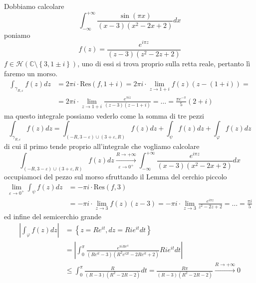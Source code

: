 Dobbiamo calcolare
\begin{equation*}
\int ^{+\infty }_{-\infty }\frac{\sin\left( \pi x\right)}{\left( x-3\right)\left( x^{2} -2x+2\right)} dx
\end{equation*}
poniamo
\begin{equation*}
f\left( z\right) =\frac{e^{i\pi z}}{\left( z-3\right)\left( z^{2} -2z+2\right)}
\end{equation*}
$f\in \mathcal{H}\left(\mathbb{C} \setminus \left\{3,1\pm i\right\}\right)$, uno di essi si trova proprio sulla retta reale, pertanto lì faremo un morso.
\begin{align*}
\int _{\gamma _{R,\varepsilon }} f\left( z\right) dz & =2\pi i\cdotp \mathrm{Res}\left( f,1+i\right) =2\pi i\cdotp \lim _{z\rightarrow 1+i} f\left( z\right)\left( z-\left( 1+i\right)\right) =\\
 & =2\pi i\cdotp \lim _{z\rightarrow 1+i}\frac{e^{\pi iz}}{\left( z-3\right)\left( z-1+i\right)} =\dotsc =\frac{\pi e^{-\pi }}{5}\left( 2+i\right)
\end{align*}
ma questo integrale possiamo vederlo come la somma di tre pezzi
\begin{equation*}
\int _{\gamma _{R,\varepsilon }} f\left( z\right) dz=\int _{\left( -R,3-\varepsilon \right) \cup \left( 3+\varepsilon ,R\right)} f\left( z\right) dz+\int _{\psi } f\left( z\right) dz+\int _{\varphi } f\left( z\right) dz
\end{equation*}
di cui il primo tende proprio all'integrale che vogliamo calcolare
\begin{equation*}
\int _{\left( -R,3-\varepsilon \right) \cup \left( 3+\varepsilon ,R\right)} f\left( z\right) dz\xrightarrow[\varepsilon \rightarrow 0^{+}]{R\rightarrow +\infty }\int ^{+\infty }_{-\infty }\frac{e^{i\pi z}}{\left( x-3\right)\left( x^{2} -2x+2\right)} dx
\end{equation*}
occupiamoci del pezzo sul morso sfruttando il Lemma del cerchio piccolo
\begin{align*}
\lim _{\varepsilon \rightarrow 0^{+}}\int _{\psi } f\left( z\right) dz & =-\pi i\cdotp \mathrm{Res}\left( f,3\right)\\
 & =-\pi i\cdotp \lim _{z\rightarrow 3} f\left( z\right)\left( z-3\right) =-\pi i\cdotp \lim _{z\rightarrow 3}\frac{e^{i\pi z}}{z^{2} -2z+2} =\dotsc =\frac{\pi i}{5}
\end{align*}
ed infine del semicerchio grande
\begin{align*}
\left| \int _{\varphi } f\left( z\right) dz\right|  & =\left\{z=Re^{it} ,dz=Rie^{it} dt\right\}\\
 & =\left| \int ^{\pi }_{0}\frac{e^{\pi iRe^{it}}}{\left( Re^{it} -3\right)\left( R^{2} e^{i2t} -2Re^{it} +2\right)} Rie^{it} dt\right| \\
 & \leqslant \int ^{\pi }_{0}\frac{R}{\left( R-3\right)\left( R^{2} -2R-2\right)} dt=\frac{R\pi }{\left( R-3\right)\left( R^{2} -2R-2\right)}\xrightarrow{R\rightarrow +\infty } 0
\end{align*}
